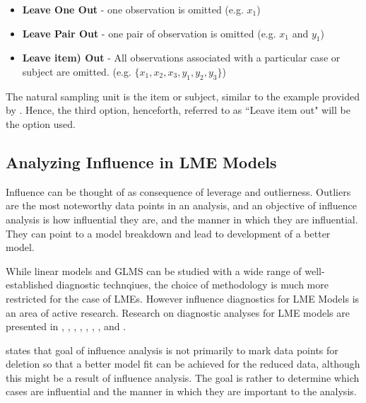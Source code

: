 \documentclass[12pt, a4paper]{report}
\theoremstyle{definition}
\theoremstyle{remark}
\begin{document}
\begin{itemize}
\item \textbf{Leave One Out} - one observation is omitted (e.g. $x_1$)
\item \textbf{Leave Pair Out} - one pair of observation  is omitted (e.g. $x_1$ and $y_1$)
\item \textbf{Leave item) Out} - All observations associated with a particular case or subject are omitted. (e.g. $\{x_1,x_2,x_3,y_1,y_2,y_3\}$)
\end{itemize}

The natural sampling unit is the item or subject, similar to the example provided by \citet{schabenberger}. Hence, the third option, henceforth, referred to as ``Leave item out" will be the option used.




\subsection{Analyzing Influence in LME Models}







Influence can be thought of as consequence of leverage and outlierness. Outliers are the most noteworthy data points in an analysis, and an objective of influence analysis is how influential they are, and the manner in which they are influential. They can point to a model breakdown and lead to development of a better model.

While linear models and GLMS can be studied with a wide range of well-established diagnostic technqiues, the choice of methodology is much more restricted for the case of LMEs. However
influence diagnostics for LME Models is an area of active research. Research on diagnostic analyses for LME models are presented in \citet{Beckman}, 
\citet{Christensen}, \citet{Hilden95}, \citet{lesaffre1998local}, \citet{Banerjee1997}, 
\citet{fung2002}, \citet{Demi}, \citet{Zewotir} and \citet{NobreSinger2007, NobreSinger2011}.



\citet{schabenberger} states that goal of influence analysis is not primarily to mark data points for deletion so that a better model fit can be achieved for the reduced data, although this might be a result of influence analysis. The goal is rather to determine which cases are influential and the manner in which they are important to the analysis. 
\end{document}
